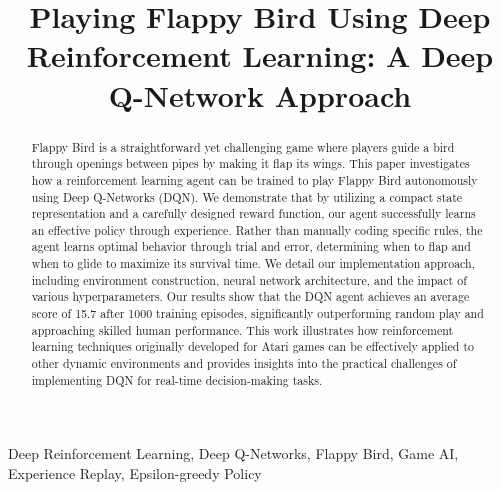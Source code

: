 \documentclass[conference]{IEEEtran}
\begin{document}
\title{Playing Flappy Bird Using Deep Reinforcement Learning: A Deep Q-Network Approach\\}

\author{
\and
{}
}

\maketitle

\begin{abstract}
Flappy Bird is a straightforward yet challenging game where players guide a bird through openings between pipes by making it flap its wings. This paper investigates how a reinforcement learning agent can be trained to play Flappy Bird autonomously using Deep Q-Networks (DQN). We demonstrate that by utilizing a compact state representation and a carefully designed reward function, our agent successfully learns an effective policy through experience. Rather than manually coding specific rules, the agent learns optimal behavior through trial and error, determining when to flap and when to glide to maximize its survival time. We detail our implementation approach, including environment construction, neural network architecture, and the impact of various hyperparameters. Our results show that the DQN agent achieves an average score of 15.7 after 1000 training episodes, significantly outperforming random play and approaching skilled human performance. This work illustrates how reinforcement learning techniques originally developed for Atari games can be effectively applied to other dynamic environments and provides insights into the practical challenges of implementing DQN for real-time decision-making tasks.
\end{abstract}

\begin{IEEEkeywords}
Deep Reinforcement Learning, Deep Q-Networks, Flappy Bird, Game AI, Experience Replay, Epsilon-greedy Policy
\end{IEEEkeywords}
\end{document}
